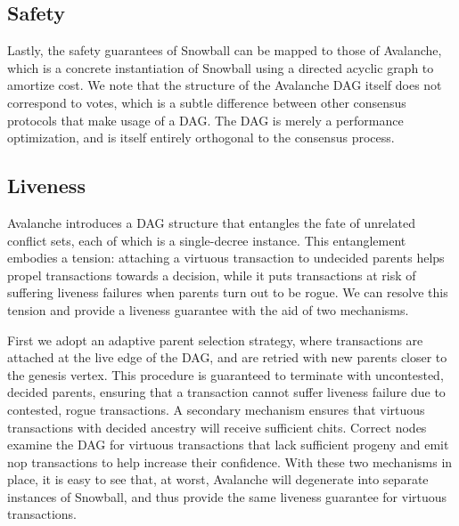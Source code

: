 \documentclass[letterpaper,twocolumn,10pt]{article}
\newcommand{\editinsert}[1]{{\color{blue}#1}}
\theoremstyle{definition}
\begin{document}
\editinsert{%
\subsection{Safety}
Lastly, the safety guarantees of Snowball can be mapped to those of Avalanche, which is a concrete instantiation of Snowball using a directed acyclic graph to amortize cost. 
We note that the structure of the Avalanche DAG itself does not correspond to votes, which is a subtle difference between other consensus protocols that make usage of a DAG. The DAG is merely a performance optimization, and is itself entirely orthogonal to the consensus process.
}

\editinsert{
\subsection{Liveness}
Avalanche introduces a DAG structure that entangles the fate of unrelated conflict sets, each of which is a single-decree instance.
This entanglement embodies a tension: attaching a virtuous transaction to undecided parents helps propel transactions towards a decision, while it puts transactions at risk of suffering liveness failures when parents turn out to be rogue.
We can resolve this tension and provide a liveness guarantee with the aid of two mechanisms.

First we adopt an adaptive parent selection strategy, where transactions are attached at the live edge of the DAG, and are retried with new parents closer to the genesis vertex. This procedure is guaranteed to terminate with uncontested, decided parents, ensuring that a transaction cannot suffer liveness failure due to contested, rogue transactions. 
A secondary mechanism ensures that virtuous transactions with decided ancestry will receive sufficient chits. Correct nodes examine the DAG for virtuous transactions that lack sufficient progeny and emit nop transactions to help increase their confidence.
With these two mechanisms in place, it is easy to see that, at worst, Avalanche will degenerate into separate instances of Snowball, and thus provide the same liveness guarantee for virtuous transactions.
}
\end{document}
